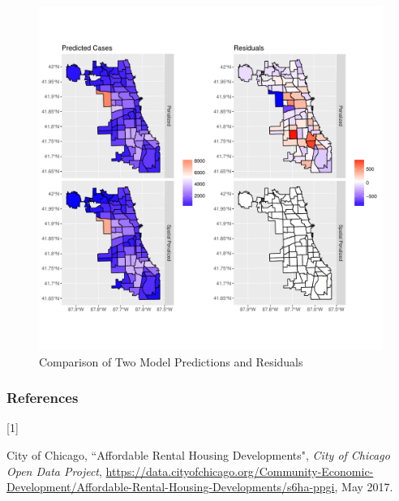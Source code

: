 \documentclass{article} %
\begin{document}
\begin{center}
\begin{figure}[ht]
\includegraphics[width = \textwidth]{Plots/results}
\caption{Comparison of Two Model Predictions and Residuals}
\label{fig:spatialplots}
\end{figure}
\end{center}







\clearpage\newpage


\subsubsection*{References}

\hypertarget{Ref1}{[1]} {City of Chicago, ``Affordable Rental Housing Developments", \textit{City of Chicago Open Data Project}, \url{https://data.cityofchicago.org/Community-Economic-Development/Affordable-Rental-Housing-Developments/s6ha-ppgi}, May 2017.}
\end{document}
